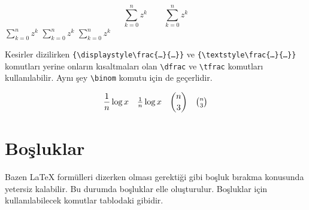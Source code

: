 \documentclass[
  10pt,
]{scrbook}
\newenvironment{Shaded}{\begin{snugshade}}{\end{snugshade}}
\newcommand{\FunctionTok}[1]{\textcolor[rgb]{0.00,0.00,0.00}{#1}}
\newcommand{\SpecialCharTok}[1]{\textcolor[rgb]{0.00,0.00,0.00}{#1}}
\newcommand{\SpecialStringTok}[1]{\textcolor[rgb]{0.31,0.60,0.02}{#1}}
\theoremstyle{definition}
\theoremstyle{definition}
\theoremstyle{definition}
\theoremstyle{definition}
\theoremstyle{remark}
\begin{document}
\[
\sum_{k=0}^n z^k \qquad \textstyle\sum_{k=0}^n z^k
\]
\(\displaystyle\sum_{k=0}^n z^k\)\qquad 
\(\sum_{k=0}^n z^k\) \qquad
\(\scriptstyle\sum_{k=0}^n z^k\)

Kesirler dizilirken \texttt{\{\textbackslash{}displaystyle\textbackslash{}frac\{…\}\{…\}\}} ve
\texttt{\{\textbackslash{}textstyle\textbackslash{}frac\{…\}\{…\}\}} komutları yerine onların kısaltmaları olan
\texttt{\textbackslash{}dfrac} ve \texttt{\textbackslash{}tfrac} komutları kullanılabilir. Aynı şey \texttt{\textbackslash{}binom} komutu
için de geçerlidir.

\begin{Shaded}
\end{Shaded}

\[
\frac{1}{n}\log x \quad
\tfrac{1}{n}\log x \quad
\binom{n}{3} \quad
\tbinom{n}{3}
\]

\hypertarget{boux15fluklar}{%
\section{Boşluklar}\label{boux15fluklar}}

Bazen LaTeX formülleri dizerken olması gerektiği gibi boşluk bırakma
konusunda yetersiz kalabilir. Bu durumda boşluklar elle oluşturulur.
Boşluklar için kullanılabilecek komutlar tablodaki gibidir.
\end{document}
